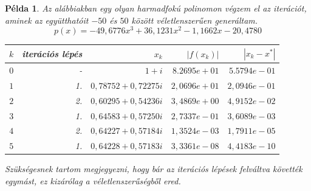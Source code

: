 \documentclass[a4paper,12pt]{report}
\newtheorem{Pl}[Tet]{Példa}
\begin{document}
            \begin{Pl}
				Az alábbiakban egy olyan harmadfokú polinomon végzem el az iterációt, aminek az együtthatóit $-50$ és $50$ között véletlenszerűen generáltam.
				\[p(x)=-49,\!6776x^3+36,\!1231x^2-1,\!1662x-20,\!4780\]
				\begin{center}
					\begin{tabular}{|r|r|r|r|r|}
						\hline
						$k$ &   iterációs lépés &   $x_k$                   &   $|f(x_k)|$      &   $|x_k-x^*|$  \\ \hline
						$0$ &   -               &   $1+i$                   &   $8.2695e+01$    &   $5.5794e-01$ \\
						$1$ &   1.              &   $0,\!78752 + 0,\!72275i$    &   $2,\!0696e+01$    &   $2,\!0946e-01$ \\
						$2$ &   2.              &   $0,\!60295 + 0,\!54236i$    &   $3,\!4869e+00$    &   $4,\!9152e-02$ \\
						$3$ &   1.              &   $0,\!64583 + 0,\!57250i$    &   $2,\!7337e-01$    &   $3,\!6089e-03$ \\
						$4$ &   2.              &   $0,\!64227 + 0,\!57184i$    &   $1,\!3524e-03$    &   $1,\!7911e-05$ \\
						$5$ &   1.              &   $0,\!64228 + 0,\!57183i$    &   $3,\!3361e-08$    &   $4,\!4183e-10$ \\
						\hline
					\end{tabular}
				\end{center}
                Szükségesnek tartom megjegyezni, hogy bár az iterációs lépések felváltva követték egymást, ez kizárólag a véletlenszerűségből ered.
			\end{Pl}
\end{document}
